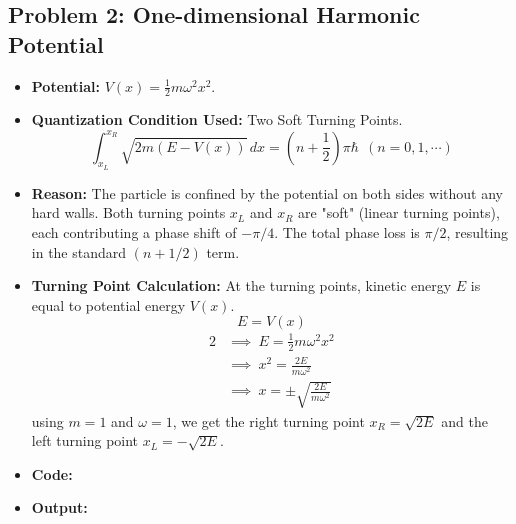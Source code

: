 \documentclass[12pt, a4paper, twoside]{article}
\begin{document}
        \subsection{Problem 2: One-dimensional Harmonic Potential}
        \begin{itemize}
            \item {\bf Potential: } $V(x) = \frac{1}{2} m \omega^2 x^2$.
            \item {\bf Quantization Condition Used: } Two Soft Turning Points. $${\int_{x_L}^{x_R} \sqrt{2m(E-V(x))} \, dx} = {\left(n + \frac{1}{2}\right) \pi \hbar} ~~ (n = 0, 1, \cdots)$$
            \item {\bf Reason: }  The particle is confined by the potential on both sides without any hard walls. Both turning points $x_L$ and $x_R$ are "soft" (linear turning points), each contributing a phase shift of $-\pi/4$. The total phase loss is $\pi/2$, resulting in the standard $(n + 1/2)$ term.
            \item {\bf Turning Point Calculation: } At the turning points, kinetic energy $E$ is equal to potential energy $V(x)$. $$E = V(x)$$ \begin{alignat*}{2}
                &\implies ~ E = \frac{1}{2} m \omega^2 x^2 \\
                &\implies ~ x^2 = \frac{2E}{m \omega^2} \\
                &\implies ~ x = \pm \sqrt{\frac{2E}{m \omega^2}}
            \end{alignat*}
            using $m = 1$ and $\omega = 1$, we get the right turning point $ \boxed{x_R = \sqrt{2E}}$ and the left turning point $\boxed{x_L = -\sqrt{2E}}$.
            \item {\bf Code: } 
            \item {\bf Output: } 
        \end{itemize}
        
\end{document}
